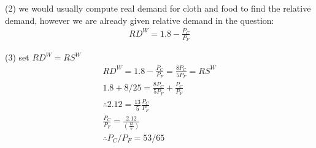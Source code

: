 \documentclass{article}
\begin{document}
(2) we would usually compute real demand for cloth and food to find the relative demand, however we are already given relative demand in the question:
\begin{gather*}
  RD^{W} = 1.8 - \frac{P_{C}}{P_{F}}
\end{gather*}

(3) set $RD^{W} = RS^{W}$
\begin{gather*}
  RD^{W} = 1.8 - \frac{P_{C}}{P_{F}} = \frac{8P_{C}}{5P_{F}} = RS^{W} \\
  1.8 + 8/25 = \frac{8P_{C}}{5P_{F}} + \frac{P_{C}}{P_{F}} \\
  \therefore 2.12 = \frac{13}{5} \frac{P_{C}}{P_{F}} \\
  \frac{P_{C}}{P_{F}} = \frac{2.12}{(\frac{13}{5})} \\
  \therefore P_{C}/P_{F} = 53/65
\end{gather*}
\end{document}
